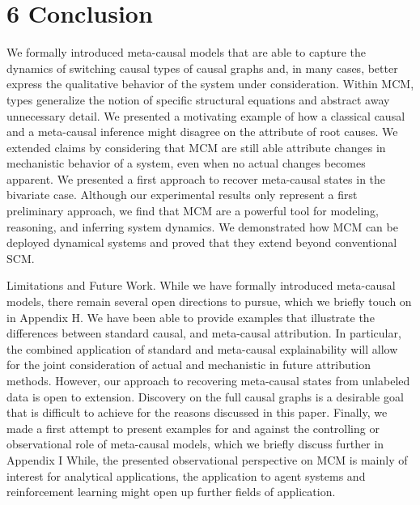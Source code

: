 \documentclass[10pt]{article}
\begin{document}
\section*{6 Conclusion}
We formally introduced meta-causal models that are able to capture the dynamics of switching causal types of causal graphs and, in many cases, better express the qualitative behavior of the system under consideration. Within MCM, types generalize the notion of specific structural equations and abstract away unnecessary detail. We presented a motivating example of how a classical causal and a meta-causal inference might disagree on the attribute of root causes. We extended claims by considering that MCM are still able attribute changes in mechanistic behavior of a system, even when no actual changes becomes apparent. We presented a first approach to recover meta-causal states in the bivariate case. Although our experimental results only represent a first preliminary approach, we find that MCM are a powerful tool for modeling, reasoning, and inferring system dynamics. We demonstrated how MCM can be deployed dynamical systems and proved that they extend beyond conventional SCM.

Limitations and Future Work. While we have formally introduced meta-causal models, there remain several open directions to pursue, which we briefly touch on in Appendix H. We have been able to provide examples that illustrate the differences between standard causal, and meta-causal attribution. In particular, the combined application of standard and meta-causal explainability will allow for the joint consideration of actual and mechanistic in future attribution methods. However, our approach to recovering meta-causal states from unlabeled data is open to extension. Discovery on the full causal graphs is a desirable goal that is difficult to achieve for the reasons discussed in this paper. Finally, we made a first attempt to present examples for and against the controlling or observational role of meta-causal models, which we briefly discuss further in Appendix I While, the presented observational perspective on MCM is mainly of interest for analytical applications, the application to agent systems and reinforcement learning might open up further fields of application.
\end{document}
